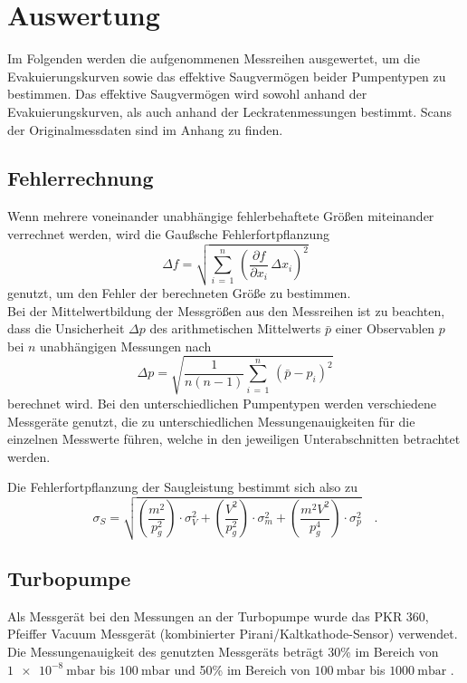 \section{Auswertung}
\label{sec:Auswertung}

Im Folgenden werden die aufgenommenen Messreihen ausgewertet, um die Evakuierungskurven sowie das effektive Saugvermögen beider Pumpentypen zu bestimmen. Das effektive Saugvermögen wird sowohl anhand der Evakuierungskurven, als auch anhand der Leckratenmessungen bestimmt. Scans der Originalmessdaten sind im Anhang zu finden.

\subsection{Fehlerrechnung}
\noindent
Wenn mehrere voneinander unabhängige fehlerbehaftete Größen miteinander verrechnet werden, wird die Gaußsche Fehlerfortpflanzung
\begin{equation}
\Delta f = \sqrt{\sum_{i \, = \, 1}^{n} \, \left(\frac{\partial f}{\partial x_i} \, \Delta x_i\right)^2}
\label{eq:ffp}
\end{equation}
genutzt, um den Fehler der berechneten Größe zu bestimmen.\\
Bei der Mittelwertbildung der Messgrößen aus den Messreihen ist zu beachten, dass die Unsicherheit $\Delta p$ des arithmetischen Mittelwerts $\bar{p}$ einer Observablen $p$ bei $n$ unabhängigen Messungen nach
\begin{equation}
\Delta p =  \sqrt{\frac{1}{n(n-1)} \sum_{i \, = \, 1}^{n} \, \left(\bar{p}- p_i\right)^2}
\label{eq:mittel}
\end{equation}
berechnet wird. Bei den unterschiedlichen Pumpentypen werden verschiedene Messgeräte genutzt, die zu unterschiedlichen Messungenauigkeiten für die einzelnen Messwerte führen, welche in den jeweiligen Unterabschnitten betrachtet werden.

\noindent
Die Fehlerfortpflanzung der Saugleistung bestimmt sich also zu
\begin{equation*}
  \sigma_{S} = \sqrt{\left(\frac{m^2}{p_g^2}\right) \cdot \sigma_{V}^2 + \left(\frac{V^2}{p_g^2}\right) \cdot \sigma_m^2 + \left(\frac{m^2 V^2}{p_g^4}\right) \cdot \sigma_p^2} \quad .
\end{equation*}


\subsection{Turbopumpe}
Als Messgerät bei den Messungen an der Turbopumpe wurde das PKR 360, Pfeiffer Vacuum Messgerät (kombinierter Pirani/Kaltkathode-Sensor) verwendet. Die Messungenauigkeit des genutzten Messgeräts beträgt 30\% im Bereich von  $\SI{1e-8}{\milli\bar}$ bis $\SI{100}{\milli\bar}$ und 50\% im Bereich von $\SI{100}{\milli\bar}$ bis $\SI{1000}{\milli\bar}$ \cite{V70}.

